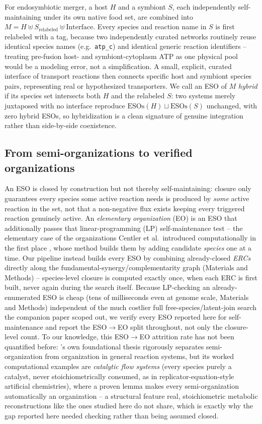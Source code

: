 \documentclass[9pt,twocolumn,twoside]{pnas-new}
\begin{document}
For endosymbiotic merger, a host $H$ and a symbiont $S$, each independently self-maintaining under its own native food set, are combined into $M = H \uplus S_{\text{relabeled}} \uplus \text{Interface}$. Every species and reaction name in $S$ is first relabeled with a tag, because two independently curated networks routinely reuse identical species names (e.g.\ \texttt{atp\_c}) and identical generic reaction identifiers -- treating pre-fusion host- and symbiont-cytoplasm ATP as one physical pool would be a modeling error, not a simplification. A small, explicit, curated interface of transport reactions then connects specific host and symbiont species pairs, representing real or hypothesized transporters. We call an ESO of $M$ \emph{hybrid} if its species set intersects both $H$ and the relabeled $S$: two systems merely juxtaposed with no interface reproduce $\mathrm{ESOs}(H) \sqcup \mathrm{ESOs}(S)$ unchanged, with zero hybrid ESOs, so hybridization is a clean signature of genuine integration rather than side-by-side coexistence.

\subsection*{From semi-organizations to verified organizations}
An ESO is closed by construction but not thereby self-maintaining: closure only guarantees every species some active reaction needs is produced by \emph{some} active reaction in the set, not that a non-negative flux exists keeping every triggered reaction genuinely active. An \emph{elementary organization} (EO) is an ESO that additionally passes that linear-programming (LP) self-maintenance test -- the elementary case of the organizations Centler et al.\ introduced computationally in the first place \cite{centler2008computing}, whose method builds them by adding candidate \emph{species} one at a time. Our pipeline instead builds every ESO by combining already-closed \emph{ERCs} directly along the fundamental-synergy/complementarity graph (Materials and Methods) -- species-level closure is computed exactly once, when each ERC is first built, never again during the search itself. Because LP-checking an already-enumerated ESO is cheap (tens of milliseconds even at genome scale, Materials and Methods) independent of the much costlier full free-species/latent-join search the companion paper scoped out, we verify every ESO reported here for self-maintenance and report the ESO$\to$EO split throughout, not only the closure-level count. To our knowledge, this ESO$\to$EO attrition rate has not been quantified before: \citeauthor{seminal}'s own foundational thesis \cite{speroni2007thesis} rigorously separates semi-organization from organization in general reaction systems, but its worked computational examples are \emph{catalytic flow systems} (every species purely a catalyst, never stoichiometrically consumed, as in replicator-equation-style artificial chemistries), where a proven lemma makes every semi-organization automatically an organization -- a structural feature real, stoichiometric metabolic reconstructions like the ones studied here do not share, which is exactly why the gap reported here needed checking rather than being assumed closed.
\end{document}
